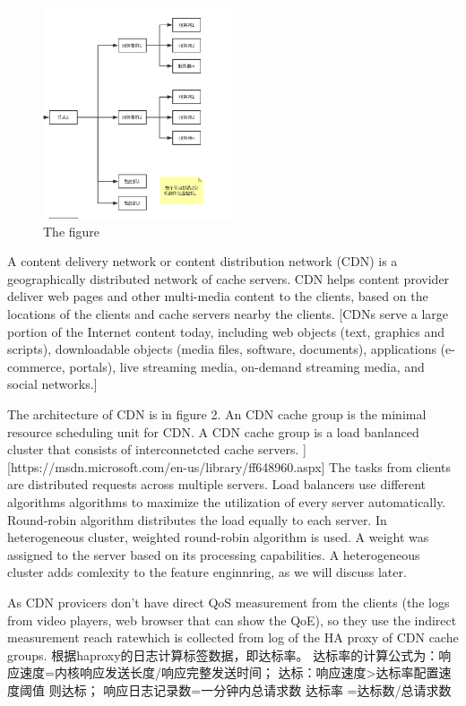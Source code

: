 \documentclass[5p]{elsarticle}
\newcommand{\dabiaolv}{reach rate}
\begin{document}
\begin{figure}[h]
    \centering
    \includegraphics[width=0.5\textwidth]{cache_group.png}
    \caption{The figure }
    \label{fig:cache_server_group}
\end{figure}

A content delivery network or content distribution network (CDN) is a geographically distributed network of cache servers. CDN helps content provider deliver web pages and other multi-media content to the clients, based on the locations of the clients and cache servers nearby the clients. [CDNs serve a large portion of the Internet content today, including web objects (text, graphics and scripts), downloadable objects (media files, software, documents), applications (e-commerce, portals), live streaming media, on-demand streaming media, and social networks.]

The architecture of CDN is in figure 2. An CDN cache group is the {minimal} resource scheduling unit for CDN. A CDN cache group is a load banlanced cluster that consists of interconnetcted cache servers. ][https://msdn.microsoft.com/en-us/library/ff648960.aspx] The tasks from clients are distributed requests across multiple servers. Load balancers use different algorithms algorithms to maximize the utilization of every server automatically. Round-robin algorithm distributes the load equally to each server. In heterogeneous cluster,  weighted round-robin algorithm is used. A weight was assigned to the server based on its processing capabilities. A heterogeneous cluster adds comlexity to the feature enginnring, as we will discuss later.

As CDN provicers don't have direct QoS measurement from the clients (the logs from video players, web browser that can show the QoE), so they use the indirect measurement \dabiaolv which is collected from log of the HA proxy of CDN cache groups.
根据haproxy的日志计算标签数据，即达标率。
达标率的计算公式为：响应速度=内核响应发送长度/响应完整发送时间；
达标：响应速度>达标率配置速度阈值 则达标；
响应日志记录数=一分钟内总请求数
达标率 =达标数/总请求数
\end{document}
